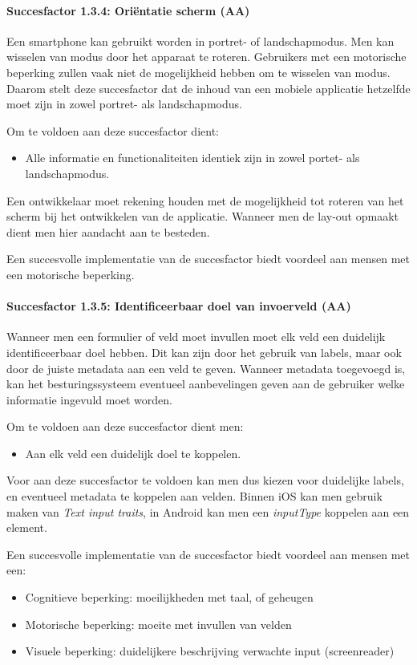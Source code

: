 \paragraph{Succesfactor 1.3.4:  Oriëntatie scherm (AA)}
Een smartphone kan gebruikt worden in portret- of landschapmodus. Men kan wisselen van modus door het apparaat te roteren. 
Gebruikers met een motorische beperking zullen vaak niet de mogelijkheid hebben om te wisselen van modus. Daarom stelt deze succesfactor dat de inhoud van een mobiele applicatie hetzelfde moet zijn in zowel portret- als landschapmodus.

Om te voldoen aan deze succesfactor dient:
\begin{itemize}
    \item Alle informatie en functionaliteiten identiek zijn in zowel portet- als landschapmodus.
\end{itemize}

Een ontwikkelaar moet rekening houden met de mogelijkheid tot roteren van het scherm bij het ontwikkelen van de applicatie. Wanneer men de lay-out opmaakt dient men hier aandacht aan te besteden.

Een succesvolle implementatie van de succesfactor biedt voordeel aan mensen met een motorische beperking.

\paragraph{Succesfactor 1.3.5:  Identificeerbaar doel van invoerveld (AA)}
Wanneer men een formulier of veld moet invullen moet elk veld een duidelijk identificeerbaar doel hebben. Dit kan zijn door het gebruik van labels, maar ook door de juiste metadata aan een veld te geven.
Wanneer metadata toegevoegd is, kan het besturingssysteem eventueel aanbevelingen geven aan de gebruiker welke informatie ingevuld moet worden.

Om te voldoen aan deze succesfactor dient men:
\begin{itemize}
    \item Aan elk veld een duidelijk doel te koppelen.
\end{itemize}

Voor aan deze succesfactor te voldoen kan men dus kiezen voor duidelijke labels, en eventueel metadata te koppelen aan velden. Binnen iOS kan men gebruik maken van \emph{Text input traits}, in Android kan men een \emph{inputType} koppelen aan een element.

Een succesvolle implementatie van de succesfactor biedt voordeel aan mensen met een:
\begin{itemize}
    \item Cognitieve beperking: moeilijkheden met taal, of geheugen
    \item Motorische beperking: moeite met invullen van velden
    \item Visuele beperking: duidelijkere beschrijving verwachte input (screenreader)
\end{itemize}

